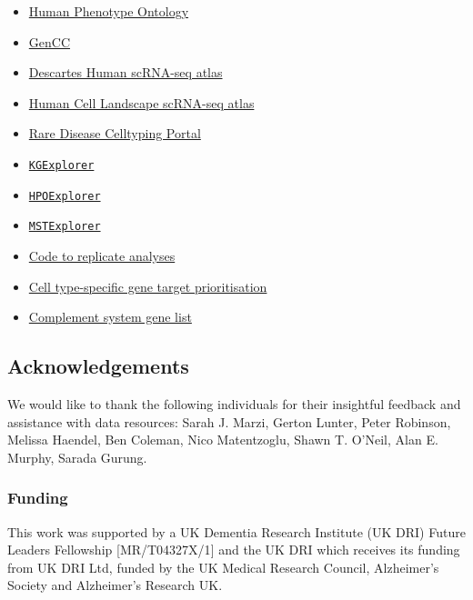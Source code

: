 \documentclass[
]{agujournal2019}
\providecommand{\tightlist}{%
  \setlength{\itemsep}{0pt}\setlength{\parskip}{0pt}}\usepackage{longtable,booktabs,array}
\begin{document}
\begin{itemize}
\tightlist
\item
  \href{https://hpo.jax.org}{Human Phenotype Ontology}
\item
  \href{https://thegencc.org/}{GenCC}
\item
  \href{https://cellxgene.cziscience.com/collections/c114c20f-1ef4-49a5-9c2e-d965787fb90c}{Descartes
  Human scRNA-seq atlas}
\item
  \href{https://cellxgene.cziscience.com/collections/38833785-fac5-48fd-944a-0f62a4c23ed1}{Human
  Cell Landscape scRNA-seq atlas}
\item
  \href{https://neurogenomics.github.io/rare_disease_celltyping_apps/home}{Rare
  Disease Celltyping Portal}
\item
  \href{https://github.com/neurogenomics/KGExplorer}{\texttt{KGExplorer}}
\item
  \href{https://github.com/neurogenomics/HPOExplorer}{\texttt{HPOExplorer}}
\item
  \href{https://github.com/neurogenomics/MSTExplorer}{\texttt{MSTExplorer}}
\item
  \href{https://github.com/neurogenomics/rare_disease_celltyping}{Code
  to replicate analyses}
\item
  \href{https://neurogenomics.github.io/RareDiseasePrioritisation/reports/prioritise_targets}{Cell
  type-specific gene target prioritisation}
\item
  \href{https://www.genenames.org/data/genegroup/\#!/group/492}{Complement
  system gene list}
\end{itemize}

\subsection{Acknowledgements}\label{acknowledgements}

We would like to thank the following individuals for their insightful
feedback and assistance with data resources: Sarah J. Marzi, Gerton
Lunter, Peter Robinson, Melissa Haendel, Ben Coleman, Nico Matentzoglu,
Shawn T. O'Neil, Alan E. Murphy, Sarada Gurung.

\subsubsection{Funding}\label{funding}

This work was supported by a UK Dementia Research Institute (UK DRI)
Future Leaders Fellowship {[}MR/T04327X/1{]} and the UK DRI which
receives its funding from UK DRI Ltd, funded by the UK Medical Research
Council, Alzheimer's Society and Alzheimer's Research UK.
\end{document}
